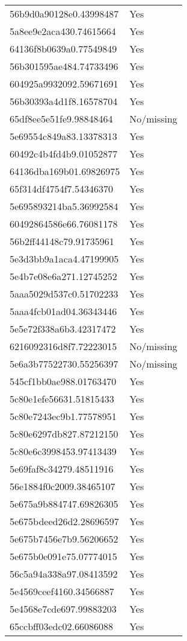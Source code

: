 \begin{tabular}{ll}
56b9d0a90128e0.43998487 & Yes \\
5a8ee9e2aca430.74615664 & Yes \\
64136f8b0639a0.77549849 & Yes \\
56b301595ae484.74733496 & Yes \\
604925a9932092.59671691 & Yes \\
56b30393a4d1f8.16578704 & Yes \\
65df8ee5e51fe9.98848464 & No/missing \\
5e69554c849a83.13378313 & Yes \\
60492c4b4fd4b9.01052877 & Yes \\
64136dba169b01.69826975 & Yes \\
65f314df4754f7.54346370 & Yes \\
5e695893214ba5.36992584 & Yes \\
60492864586e66.76081178 & Yes \\
56b2ff44148c79.91735961 & Yes \\
5e3d3bb9a1aca4.47199905 & Yes \\
5e4b7e08e6a271.12745252 & Yes \\
5aaa5029d537c0.51702233 & Yes \\
5aaa4fcb01ad04.36343446 & Yes \\
5e5e72f338a6b3.42317472 & Yes \\
6216092316d8f7.72223015 & No/missing \\
5e6a3b77522730.55256397 & No/missing \\
545cf1bb0ae988.01763470 & Yes \\
5c80e1efe56631.51815433 & Yes \\
5c80e7243ec9b1.77578951 & Yes \\
5c80e6297db827.87212150 & Yes \\
5c80e6c3998453.97413439 & Yes \\
5e69faf8c34279.48511916 & Yes \\
56e1884f0c2009.38465107 & Yes \\
5e675a9b884747.69826305 & Yes \\
5e675bdeed26d2.28696597 & Yes \\
5e675b7456e7b9.56206652 & Yes \\
5e675b0e091e75.07774015 & Yes \\
56c5a94a338a97.08413592 & Yes \\
5e4569ceef4160.34566887 & Yes \\
5e4568e7cde697.99883203 & Yes \\
65ccbff03edc02.66086088 & Yes \\

\end{tabular}
